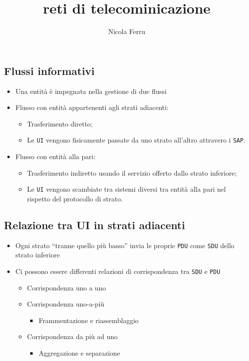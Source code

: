 \documentclass{book}
\title{reti di telecominicazione}
\author{Nicola Ferru}
\theoremstyle{definition}
\begin{document}

\tableofcontents

\clearpage
\subsection{Flussi informativi}
\label{sec:flusinfo}

\begin{itemize}
\item Una entità è impegnata nella gestione di due flussi
\item Flusso con entità appartenenti agli strati adiacenti:
  \begin{itemize}
  \item Trasferimento diretto;
  \item Le \texttt{UI} vengono fisicamente passate da uno strato all'altro attravero i \texttt{SAP}.
  \end{itemize}
\item Flusso con entità alla pari:
  \begin{itemize}
  \item Trasferimento indiretto usando il servizio offerto dallo strato inferiore;
  \item Le \texttt{UI} vengono scambiate tra sistemi diversi tra entità alla pari nel rispetto del protocollo
    di strato.
  \end{itemize}
\end{itemize}

\subsection{Relazione tra UI in strati adiacenti}
\label{sec:reltrauiinstratiadia}
\begin{itemize}
\item Ogni strato ``tranne quello più basso'' invia le proprie \texttt{PDU} come \texttt{SDU} dello strato inferiore
\item Ci possono essere differenti relazioni di corrispondenza tra \texttt{SDU} e \texttt{PDU}
  \begin{itemize}
  \item Corrispondenza uno a uno
    \begin{center}
      
    \end{center}
  \item Corrispondenza uno-a-più
    \begin{center}
      
    \end{center}
    \begin{itemize}
    \item Frammentazione e riassemblaggio
    \end{itemize}
  \item Corrispondenza da più ad uno
    \begin{center}
      
    \end{center}   
    \begin{itemize}
    \item Aggregazione e separazione
    \end{itemize}
  \end{itemize}
\end{itemize}
\clearpage
\end{document}

